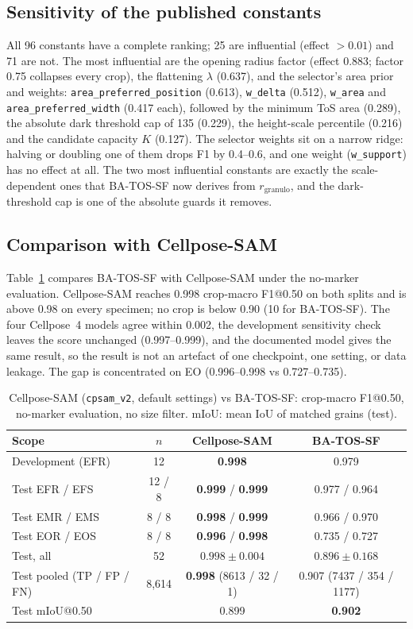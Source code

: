 \documentclass[12pt]{article}
\newcommand{\SF}{BA-TOS-SF}
\newcommand{\CP}{Cellpose-SAM}
\newcommand{\rg}{r_{\mathrm{granulo}}}
\begin{document}
\subsection{Sensitivity of the published constants}

All 96 constants have a complete ranking; 25 are influential (effect $>0.01$) and 71 are not. The most influential
are the opening radius factor (effect 0.883; factor 0.75 collapses every crop), the flattening $\lambda$ (0.637), and
the selector's area prior and weights: \texttt{area\_preferred\_position} (0.613), \texttt{w\_delta} (0.512),
\texttt{w\_area} and \texttt{area\_preferred\_width} (0.417 each), followed by the minimum ToS area (0.289), the
absolute dark threshold cap of 135 (0.229), the height-scale percentile (0.216) and the candidate capacity $K$
(0.127). The selector weights sit on a narrow ridge: halving or doubling one of them drops F1 by 0.4--0.6, and one
weight (\texttt{w\_support}) has no effect at all. The two most influential constants are exactly the scale-dependent
ones that \SF{} now derives from $\rg$, and the dark-threshold cap is one of the absolute guards it removes.

\subsection{Comparison with Cellpose-SAM}
\label{sec:cellpose}

Table~\ref{tab:cellpose} compares \SF{} with \CP{} under the no-marker evaluation. \CP{} reaches 0.998 crop-macro
F1@0.50 on both splits and is above 0.98 on every specimen; no crop is below 0.90 (10 for \SF). The four Cellpose~4
models agree within 0.002, the development sensitivity check leaves the score unchanged (0.997--0.999), and the
documented model gives the same result, so the result is not an artefact of one checkpoint, one setting, or data
leakage. The gap is concentrated on EO (0.996--0.998 vs 0.727--0.735).

\begin{table}[t]
\centering
\caption{\CP{} (\texttt{cpsam\_v2}, default settings) vs \SF: crop-macro F1@0.50, no-marker evaluation, no size
filter. mIoU: mean IoU of matched grains (test).}
\label{tab:cellpose}
\small
\begin{tabular}{lccc}
\toprule
Scope & $n$ & \CP & \SF \\
\midrule
Development (EFR) & 12 & \textbf{0.998} & 0.979 \\
Test EFR / EFS & 12 / 8 & \textbf{0.999} / \textbf{0.999} & 0.977 / 0.964 \\
Test EMR / EMS & 8 / 8 & \textbf{0.998} / \textbf{0.999} & 0.966 / 0.970 \\
Test EOR / EOS & 8 / 8 & \textbf{0.996} / \textbf{0.998} & 0.735 / 0.727 \\
Test, all & 52 & $\mathbf{0.998 \pm 0.004}$ & $0.896 \pm 0.168$ \\
Test pooled (TP / FP / FN) & 8,614 & \textbf{0.998} (8613 / 32 / 1) & 0.907 (7437 / 354 / 1177) \\
Test mIoU@0.50 & & 0.899 & \textbf{0.902} \\
\bottomrule
\end{tabular}
\end{table}
\end{document}
